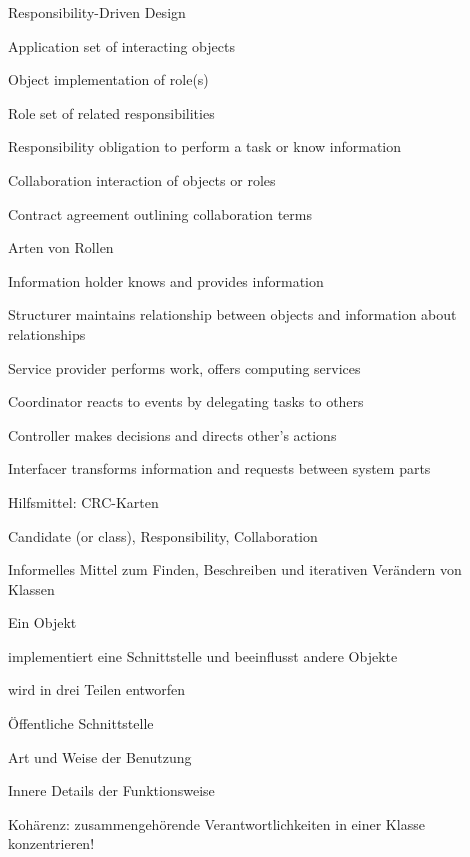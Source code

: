 \documentclass[a4paper]{article}
\begin{document}
\begin{multicols}{3}
  Responsibility-Driven Design
  \begin{description*}
    \item[Application] set of interacting objects
    \item[Object] implementation of role(s)
    \item[Role] set of related responsibilities
    \item[Responsibility] obligation to perform a task or know information
    \item[Collaboration] interaction of objects or roles
    \item[Contract] agreement outlining collaboration terms
  \end{description*}

  Arten von Rollen
  \begin{description*}
    \item[Information holder] knows and provides information
    \item[Structurer] maintains relationship between objects and information about relationships
    \item[Service provider] performs work, offers computing services
    \item[Coordinator] reacts to events by delegating tasks to others
    \item[Controller] makes decisions and directs other’s actions
    \item[Interfacer] transforms information and requests between system parts
  \end{description*}

  Hilfsmittel: CRC-Karten
  \begin{itemize*}
    \item Candidate (or class), Responsibility, Collaboration
    \item Informelles Mittel zum Finden, Beschreiben und iterativen Verändern von Klassen
  \end{itemize*}

  Ein Objekt
  \begin{itemize*}
    \item implementiert eine Schnittstelle und beeinflusst andere Objekte
    \item wird in drei Teilen entworfen
    \begin{itemize*}
      \item Öffentliche Schnittstelle
      \item Art und Weise der Benutzung
      \item Innere Details der Funktionsweise
    \end{itemize*}
    \item Kohärenz: zusammengehörende Verantwortlichkeiten in einer Klasse konzentrieren!
  \end{itemize*}


\end{multicols}
\end{document}
